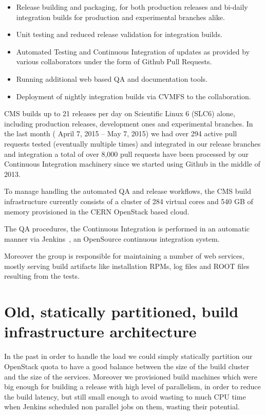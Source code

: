\documentclass[a4paper]{jpconf}
\begin{document}
\begin{itemize}

\item Release building and packaging, for both production releases and bi-daily
integration builds for production and experimental branches alike.

\item Unit testing and reduced release validation for integration builds.

\item Automated Testing and Continuous Integration of updates as provided by
various collaborators under the form of Github Pull Requests.

\item Running additional web based QA and documentation tools.

\item Deployment of nightly integration builds via CVMFS to the collaboration.

\end{itemize}

CMS builds up to 21 releases per day on Scientific Linux 6 (SLC6) alone,
including production releases, development ones and experimental branches. In
the last month ( April 7, 2015 – May 7, 2015) we had over 294 active pull
requests tested (eventually multiple times) and integrated in our release
branches and integration a total of over 8,000 pull requests have been processed
by our Continuous Integration machinery since we started using Github in the
middle of 2013.~\cite{Eulisse2014}

To manage handling the automated QA and release workflows, the CMS build
infrastructure currently consists of a cluster of 284 virtual cores and 540 GB
of memory provisioned in the CERN OpenStack based cloud.~\cite{CERNOPENSTACK}

The QA procedures, the Continuous Integration is performed in an automatic manner
via Jenkins~\cite{JENKINS}, an OpenSource continuous integration system.

Moreover the group is responsible for maintaining a number of web services,
mostly serving build artifacts like installation RPMs, log files and ROOT files
resulting from the tests.

\section{Old, statically partitioned, build infrastructure architecture}

In the past in order to handle the load we could simply statically partition our
OpenStack quota to have a good balance between the size of the build cluster and
the size of the services. Moreover we provisioned build machines which were big
enough for building a release with high level of parallelism, in order to reduce
the build latency, but still small enough to avoid wasting to much CPU time when
Jenkins scheduled non parallel jobs on them, wasting their potential.
\end{document}
